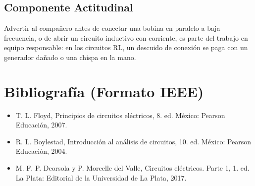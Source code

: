 \documentclass[11pt,letterpaper]{article}
\begin{document}
\subsection*{Componente Actitudinal}

\begin{cita}
Advertir al compañero antes de conectar una bobina en paralelo a baja frecuencia, o de abrir un circuito inductivo con corriente, es parte del trabajo en equipo responsable: en los circuitos RL, un descuido de conexión se paga con un generador dañado o una chispa en la mano.
\end{cita}

\section{Bibliografía (Formato IEEE)}

{\sloppy
\begin{itemize}[leftmargin=2.6em, labelwidth=2.2em, labelsep=0.4em, align=left]
  \item[{[1]}] T. L. Floyd, Principios de circuitos eléctricos, 8.\textordfeminine{} ed. México: Pearson Educación, 2007.
  \item[{[2]}] R. L. Boylestad, Introducción al análisis de circuitos, 10.\textordfeminine{} ed. México: Pearson Educación, 2004.
  \item[{[3]}] M. F. P. Deorsola y P. Morcelle del Valle, Circuitos eléctricos. Parte 1, 1.\textordfeminine{} ed. La Plata: Editorial de la Universidad de La Plata, 2017.
\end{itemize}
}
\end{document}
